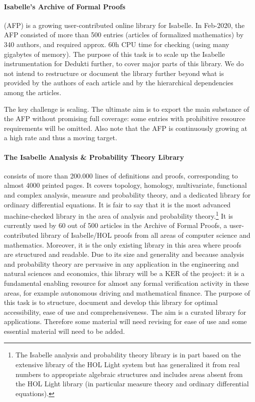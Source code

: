\paragraph*{Isabelle's Archive of Formal Proofs} (AFP) \cite{isabelle-afp} is a
growing user-contributed online library for Isabelle. In Feb-2020, the
AFP consisted of more than 500 entries (articles of formalized
mathematics) by 340 authors, and required approx. 60h CPU time for
checking (using many gigabytes of memory).  The purpose of this task
is to scale up the Isabelle instrumentation for Dedukti further, to
cover major parts of this library. We do not intend to restructure or
document the library further beyond what is provided by the authors of
each article and by the hierarchical dependencies among the articles.

The key challenge is scaling. The ultimate aim is to export the main
substance of the AFP without promising full coverage: some entries
with prohibitive resource requirements will be omitted. Also note that
the AFP is continuously growing at a high rate and thus a moving
target.

\paragraph*{The Isabelle Analysis \& Probability Theory Library} consists of more than
200.000 lines of definitions and proofs, corresponding to almost 4000 printed
pages. It covers topology, homology, multivariate, functional and complex
analysis, measure and probability theory, and a dedicated library for
ordinary differential equations. It is fair to say that it is the most
advanced machine-checked library in the area of analysis and probability
theory.\footnote{The Isabelle analysis and probability theory library is
in part based on the extensive library of the HOL Light system but has
generalized it from real numbers to appropriate algebraic structures and
includes areas absent from the HOL Light library (in particular measure
theory and ordinary differential equations).} It is currently used by 60 out
of 500 articles in the Archive of Formal Proofs, a user-contributed library
of Isabelle/HOL proofs from all areas of computer science and
mathematics. Moreover, it is the only existing library in this area where
proofs are structured and readable. Due to its size and generality and
because analysis and probability theory are pervasive in any application in
the engineering and natural sciences and economics, this library will be a
KER of the project: it is a fundamental enabling resource for almost any
formal verification activity in these areas, for example autonomous driving
and mathematical finance. The purpose of this task is to structure, document
and develop this library for optimal accessibility, ease of use and
comprehensiveness. The aim is a curated library for applications.
Therefore some material will need revising for ease
of use and some essential material will need to be added.

